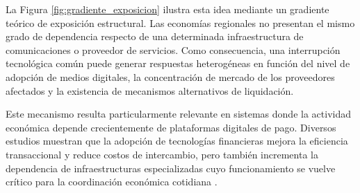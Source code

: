 La Figura \ref{fig:gradiente_exposicion} ilustra esta idea mediante un gradiente te\'orico de exposici\'on estructural. Las econom\'ias regionales no presentan el mismo grado de dependencia respecto de una determinada infraestructura de comunicaciones o 
proveedor de servicios. Como consecuencia, una interrupci\'on tecnol\'ogica 
com\'un puede generar respuestas heterog\'eneas en funci\'on del nivel de 
adopci\'on de medios digitales, la concentraci\'on de mercado de los proveedores 
afectados y la existencia de mecanismos alternativos de liquidaci\'on.

Este mecanismo resulta particularmente relevante en sistemas donde la actividad 
econ\'omica depende crecientemente de plataformas digitales de pago. Diversos 
estudios muestran que la adopci\'on de tecnolog\'ias financieras mejora la 
eficiencia transaccional y reduce costos de intercambio, pero tambi\'en 
incrementa la dependencia de infraestructuras especializadas cuyo funcionamiento 
se vuelve cr\'itico para la coordinaci\'on econ\'omica cotidiana 
\citep{jack2014risk, auer2020technology, crouzet2023shocks}.

